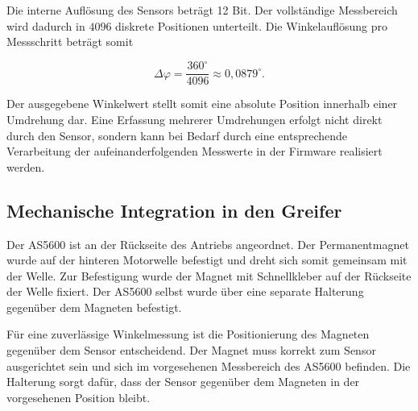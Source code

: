 Die interne Auflösung des Sensors beträgt 12 Bit. Der vollständige
Messbereich wird dadurch in $4096$ diskrete Positionen unterteilt. Die
Winkelauflösung pro Messschritt beträgt somit

\begin{equation}
\Delta\varphi
=
\frac{360^\circ}{4096}
\approx 0{,}0879^\circ.
\end{equation}

Der ausgegebene Winkelwert stellt somit eine absolute Position
innerhalb einer Umdrehung dar. Eine Erfassung mehrerer Umdrehungen
erfolgt nicht direkt durch den Sensor, sondern kann bei Bedarf durch
eine entsprechende Verarbeitung der aufeinanderfolgenden Messwerte
in der Firmware realisiert werden.

\subsection{Mechanische Integration in den Greifer}
\label{sec:encoder_montage}

Der AS5600 ist an der Rückseite des Antriebs angeordnet. Der
Permanentmagnet wurde auf der hinteren Motorwelle befestigt und dreht
sich somit gemeinsam mit der Welle. Zur Befestigung wurde der Magnet
mit Schnellkleber auf der Rückseite der Welle fixiert. Der AS5600
selbst wurde über eine separate Halterung gegenüber dem Magneten
befestigt.

Für eine zuverlässige Winkelmessung ist die Positionierung des
Magneten gegenüber dem Sensor entscheidend. Der Magnet muss
korrekt zum Sensor ausgerichtet sein und sich im vorgesehenen
Messbereich des AS5600 befinden. Die Halterung sorgt dafür, dass der Sensor gegenüber dem Magneten in der vorgesehenen Position bleibt.





